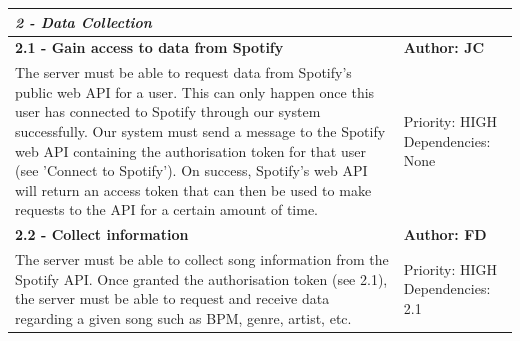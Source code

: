 \documentclass[11pt]{report}
\begin{document}
\begin{center}
\begin{longtable}{| p{13cm} | p{3cm} |}
\multicolumn{2}{|l|}{\textbf{\textit{2 - Data Collection}}} \\
\hline
\textbf{2.1 - Gain access to data from Spotify} & \textbf{Author: JC} \\
\hline
The server must be able to request data from Spotify’s public web API for a user. This can only happen once this user has connected to Spotify through our system successfully.
Our system must send a message to the Spotify web API containing the authorisation token for that user (see 'Connect to Spotify'). On success, Spotify's web API will return an access token that can then be used to make requests to the API for a certain amount of time.& Priority: HIGH Dependencies: None \\
\hline
\textbf{2.2 - Collect information} & \textbf{Author: FD} \\
\hline
The server must be able to collect song information from the Spotify API. Once granted the authorisation token (see 2.1), the server must be able to request and receive data regarding a given song such as BPM, genre, artist, etc.&Priority: HIGH Dependencies: 2.1 \\
\hline


\end{longtable}
\end{center}
\end{document}
